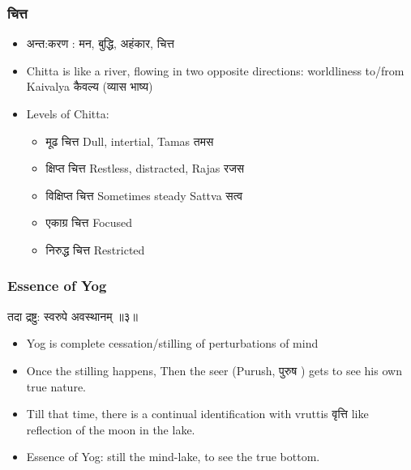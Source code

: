 \begin{frame}[fragile]\frametitle{चित्त}

	\begin{itemize}
	\item अन्त:करण : मन, बुद्धि, अहंकार, चित्त
	\item Chitta is like a river, flowing in two opposite directions: worldliness to/from Kaivalya कैवल्य (व्यास भाष्य)
	\item Levels of Chitta:
		\begin{itemize}
		\item मूढ चित्त  Dull, intertial, Tamas तमस
		\item क्षिप्त चित्त  Restless, distracted, Rajas  रजस
		\item विक्षिप्त चित्त Sometimes steady Sattva सत्व
		\item एकाग्र चित्त Focused
		\item निरुद्ध चित्त Restricted
		
		\end{itemize}	
	\end{itemize}

\end{frame}

\begin{frame}[fragile]\frametitle{Essence of Yog}

\begin{sanskrit}
तदा द्रष्टु: स्वरुपे अवस्थानम् ॥३॥
\end{sanskrit}


	\begin{itemize}
	\item Yog is complete cessation/stilling of perturbations of mind
	\item Once the stilling happens, Then the seer (Purush, पुरुष ) gets to see his own true nature.
	\item Till that time, there is a continual identification with vruttis वृत्ति like reflection of the moon in the lake.
	\item Essence of Yog: still the mind-lake, to see the true bottom.
	\end{itemize}

\end{frame}

